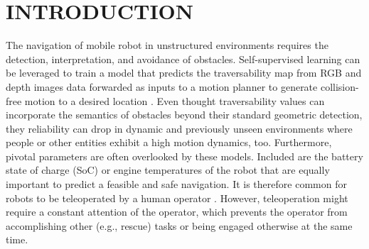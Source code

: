 \documentclass[letterpaper, 10 pt, conference]{ieeeconf}  %
\begin{document}
\section{INTRODUCTION}
The navigation of mobile robot in unstructured environments requires the detection, interpretation, and avoidance of obstacles. %
Self-supervised learning can be leveraged to train a model that predicts the traversability map from RGB and depth images data forwarded as inputs to a motion planner to generate collision-free motion to a desired location \cite{wayfaster,wayfast,leung2022hybrid,endo2024benchnav}. %
Even thought traversability values can incorporate the semantics of obstacles beyond their standard geometric detection, they reliability can drop in dynamic and previously unseen environments \cite{frey2024roadrunner,muhamad2024robust} where people or other entities exhibit a high motion dynamics, too. Furthermore, pivotal parameters are often overlooked by these models. Included are the battery state of charge (SoC) or engine temperatures of the robot that are equally important to predict a feasible and safe navigation. It is therefore common for robots to be  teleoperated by a human operator \cite{huang2024evaluation,husky}. However, teleoperation might require a constant attention of the operator, which prevents the operator from accomplishing other (e.g., rescue) tasks or being engaged otherwise at the same time.
\end{document}
